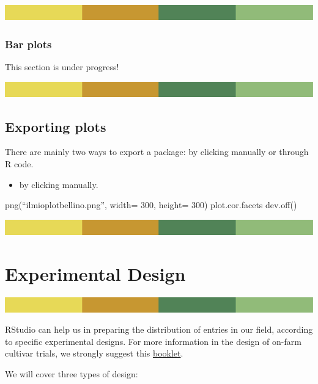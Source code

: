 \documentclass[
]{book}
\providecommand{\tightlist}{%
  \setlength{\itemsep}{0pt}\setlength{\parskip}{0pt}}
\begin{document}
\includegraphics{rsrstrip.png}

\hypertarget{bar-plots}{%
\subsection{Bar plots}\label{bar-plots}}

This section is under progress!

\includegraphics{rsrstrip.png}

\hypertarget{exporting-plots}{%
\section{Exporting plots}\label{exporting-plots}}

There are mainly two ways to export a package: by clicking manually or through R code.

\begin{itemize}
\tightlist
\item
  by clicking manually.
\end{itemize}

png(``ilmioplotbellino.png'', width= 300, height= 300)
plot.cor.facets
dev.off()

\includegraphics{rsrstrip.png}

\hypertarget{experimental-design}{%
\chapter{Experimental Design}\label{experimental-design}}

\includegraphics{rsrstrip.png}

RStudio can help us in preparing the distribution of entries in our field, according to specific experimental designs. For more information in the design of on-farm cultivar trials, we strongly suggest this \href{\%22https://www.liveseed.eu/wp-content/uploads/2021/06/LIVESEED-BOOKLET-5_FNL_web.pdf\%22}{booklet}.

We will cover three types of design:
\end{document}
